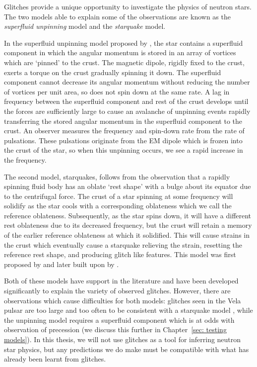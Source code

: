 
Glitches provide a unique opportunity to investigate the physics of neutron
stars. The two models able to explain some of the observations are known as the
\emph{superfluid unpinning} model and the \emph{starquake} model.

In the superfluid unpinning model proposed by \citet{Anderson1975}, the star
contains a superfluid component in which the angular momentum is stored in an
array of vortices which are `pinned' to the crust. The magnetic dipole, rigidly
fixed to the crust, exerts a torque on the crust gradually spinning it down.
The superfluid component cannot decrease its angular momentum without reducing
the number of vortices per unit area, so does not spin down at the same rate. A
lag in frequency between the superfluid component and rest of the crust
develops until the forces are sufficiently large to cause an avalanche of
unpinning events rapidly transferring the stored angular momentum in the
superfluid component to the crust. An observer measures the frequency and
spin-down rate from the rate of pulsations. These pulsations originate from the
EM dipole which is frozen into the crust of the star, so when this unpinning
occurs, we see a rapid increase in the frequency.

The second model, starquakes, follows from the observation that a rapidly
spinning fluid body has an oblate `rest shape' with a bulge about its equator
due to the centrifugal force. The crust of a star spinning at some frequency
will solidify as the star cools with a corresponding oblateness which we call
the reference oblateness. Subsequently, as the star spins down, it will have a
different rest oblateness due to its decreased frequency, but the crust will
retain a memory of the earlier reference oblateness at which it solidified.
This will cause strains in the crust which eventually cause a starquake
relieving the strain, resetting the reference rest shape, and producing glitch
like features. This model was first proposed by \citet{ruderman1969neutron} and later
built upon by \citet{Baym1971}.

Both of these models have support in the literature and have been developed
significantly to explain the variety of observed glitches. However, there are
observations which cause difficulties for both models: glitches seen in the
Vela pulsar are too large and too often to be consistent with a starquake model
\citep{chamel2008physics}, while the unpinning model requires a superfluid
component which is at odds with observation of precession (we discuss this
further in Chapter~\ref{sec: testing models}). In this thesis, we will not use
glitches as a tool for inferring neutron star physics, but any predictions we
do make must be compatible with what has already been learnt from glitches.


